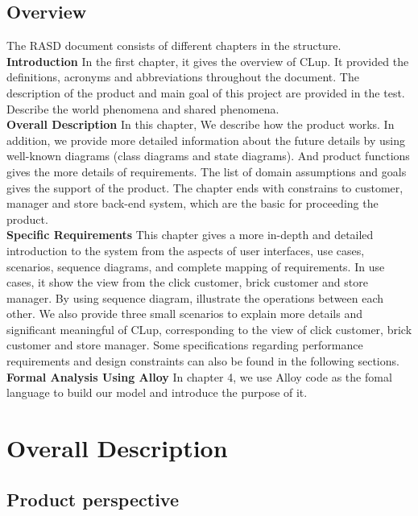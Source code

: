 \documentclass[a4paper,12pt]{report}
\begin{document}
\section{Overview}
The RASD document consists of different chapters in the structure.\\

\textbf{Introduction}  In the first chapter, it gives the overview of CLup. It provided the definitions, acronyms and abbreviations throughout the document. The description of the product and main goal of this project are provided in the test. Describe the world phenomena and shared phenomena.
\\


\textbf{Overall Description} In this chapter, We describe how the product works. In addition, we provide more detailed information about the future details by using well-known diagrams (class diagrams and state diagrams). And product functions gives the more details of requirements. The list of domain assumptions and goals gives the support of the product.  The chapter ends with constrains to customer, manager and store back-end system, which are the basic for proceeding the product.
\\

\textbf{Specific Requirements} This chapter gives a more in-depth and detailed introduction to the system from the aspects of user interfaces, use cases, scenarios, sequence diagrams, and complete mapping of requirements. In use cases, it show the view from the click customer, brick customer and store manager. By using sequence diagram, illustrate the operations between each other. We also provide three small scenarios to explain more details and significant meaningful of CLup, corresponding to the view of click customer, brick customer and store manager. Some specifications regarding performance requirements and design constraints can also be found in the following sections.\\

\textbf{Formal Analysis Using Alloy} In chapter 4, we use Alloy code as the fomal language to build our model and introduce the purpose of it.\\


\chapter{Overall Description} \label{C2:OverallDescription}
\section{Product perspective}
\end{document}

